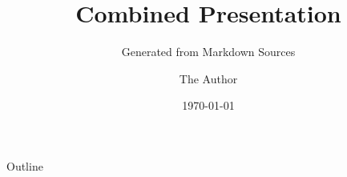 \documentclass{beamer}
\title{Combined Presentation}
\subtitle{Generated from Markdown Sources}
\author{The Author}
\institute{The Organization}
\date{\today}
\begin{document}
\frame{\titlepage}

\begin{frame}{Outline}
  \tableofcontents
\end{frame}

\end{document}
